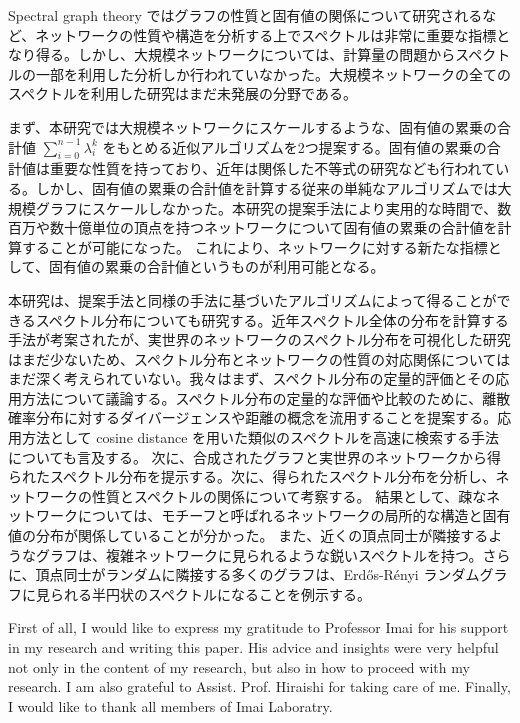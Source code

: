 \documentclass[senior,final,11pt]{iscs-thesis}
\begin{document}
\begin{jabstract}
    Spectral graph theory ではグラフの性質と固有値の関係について研究されるなど、ネットワークの性質や構造を分析する上でスペクトルは非常に重要な指標となり得る。しかし、大規模ネットワークについては、計算量の問題からスペクトルの一部を利用した分析しか行われていなかった。大規模ネットワークの全てのスペクトルを利用した研究はまだ未発展の分野である。

    まず、本研究では大規模ネットワークにスケールするような、固有値の累乗の合計値 $\sum_{i=0}^{n-1} \lambda_i^k$ をもとめる近似アルゴリズムを2つ提案する。固有値の累乗の合計値は重要な性質を持っており、近年は関係した不等式の研究なども行われている。しかし、固有値の累乗の合計値を計算する従来の単純なアルゴリズムでは大規模グラフにスケールしなかった。本研究の提案手法により実用的な時間で、数百万や数十億単位の頂点を持つネットワークについて固有値の累乗の合計値を計算することが可能になった。 これにより、ネットワークに対する新たな指標として、固有値の累乗の合計値というものが利用可能となる。

    本研究は、提案手法と同様の手法に基づいたアルゴリズムによって得ることができるスペクトル分布についても研究する。近年スペクトル全体の分布を計算する手法が考案されたが、実世界のネットワークのスペクトル分布を可視化した研究はまだ少ないため、スペクトル分布とネットワークの性質の対応関係についてはまだ深く考えられていない。我々はまず、スペクトル分布の定量的評価とその応用方法について議論する。スペクトル分布の定量的な評価や比較のために、離散確率分布に対するダイバージェンスや距離の概念を流用することを提案する。応用方法として cosine distance を用いた類似のスペクトルを高速に検索する手法についても言及する。 次に、合成されたグラフと実世界のネットワークから得られたスペクトル分布を提示する。次に、得られたスペクトル分布を分析し、ネットワークの性質とスペクトルの関係について考察する。 結果として、疎なネットワークについては、モチーフと呼ばれるネットワークの局所的な構造と固有値の分布が関係していることが分かった。 また、近くの頂点同士が隣接するようなグラフは、複雑ネットワークに見られるような鋭いスペクトルを持つ。さらに、頂点同士がランダムに隣接する多くのグラフは、Erdős-Rényi ランダムグラフに見られる半円状のスペクトルになることを例示する。


\end{jabstract}
\maketitle

\begin{acknowledge}
    First of all, I would like to express my gratitude to Professor Imai for his support in my research and writing this paper. His advice and insights were very helpful not only in the content of my research, but also in how to proceed with my research. I am also grateful to Assist. Prof. Hiraishi for taking care of me. Finally, I would like to thank all members of Imai Laboratry.
\end{acknowledge}
\end{document}
